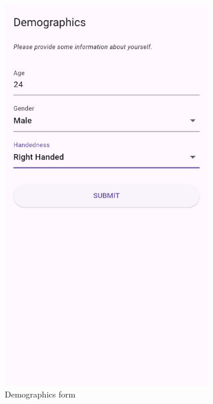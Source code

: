 \begin{figure}[!htb]
    \centering
    \begin{subfigure}{.25\textwidth}
        \centering
        \includegraphics[width=.8666\linewidth]{images/app_demographics_form.jpg}
        \caption{Demographics form}
        \label{subfig:app_demographics_form}
    \end{subfigure}%
    \begin{subfigure}{.25\textwidth}
        \centering

\end{subfigure}
\end{figure}
